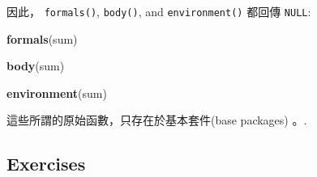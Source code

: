 \documentclass[]{book}
\newenvironment{Shaded}{\begin{snugshade}}{\end{snugshade}}
\newcommand{\KeywordTok}[1]{\textcolor[rgb]{0.13,0.29,0.53}{\textbf{#1}}}
\newcommand{\NormalTok}[1]{#1}
\theoremstyle{definition}
\theoremstyle{definition}
\theoremstyle{definition}
\theoremstyle{remark}
\begin{document}
因此， \texttt{formals()}, \texttt{body()}, and \texttt{environment()}
都回傳 \texttt{NULL}:

\begin{Shaded}
\begin{Highlighting}[]
\KeywordTok{formals}\NormalTok{(sum)}
\end{Highlighting}
\end{Shaded}

\begin{Shaded}
\begin{Highlighting}[]
\KeywordTok{body}\NormalTok{(sum)}
\end{Highlighting}
\end{Shaded}

\begin{Shaded}
\begin{Highlighting}[]
\KeywordTok{environment}\NormalTok{(sum)}
\end{Highlighting}
\end{Shaded}

這些所謂的原始函數，只存在於基本套件(base packages) 。.

\hypertarget{exercises}{%
\subsection{Exercises}\label{exercises}}
\end{document}
